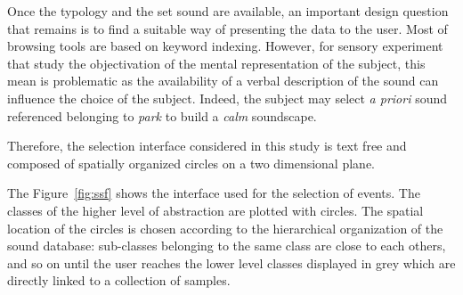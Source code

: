 \documentclass[twoside,twocolumn]{article}
\begin{document}


Once the typology and the set sound are available, an important design question that remains is to find a suitable way of presenting the data to the user. Most of browsing tools are based on keyword indexing. However, for sensory experiment that study the objectivation of the mental representation of the subject, this mean is problematic as the availability of a verbal description of the sound can influence the choice of the subject. Indeed, the subject may select \textit{a priori} sound referenced belonging to \emph{park} to build a \emph{calm} soundscape.


Therefore, the selection interface considered in this study is text free and composed of spatially organized circles on a two dimensional plane.


The Figure~\ref{fig:ssf} shows the interface used for the selection of events. The classes of the higher level of abstraction are plotted with circles. The spatial location of the circles is chosen according to the hierarchical organization of the sound database: sub-classes belonging to the same class are close to each others, and so on until the user reaches the lower level classes displayed in grey which are directly linked to a collection of samples.
\end{document}
